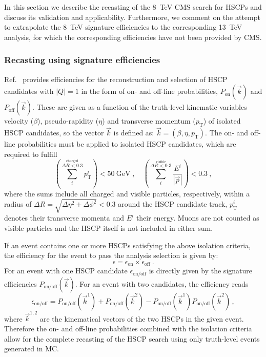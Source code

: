 In this section we describe the recasting of the 8~TeV CMS
search for HSCPs and discuss its validation and applicability.
Furthermore, we comment on the attempt to extrapolate
the 8~TeV signature efficiencies to the corresponding 13~TeV analysis, for
which the corresponding efficiencies have not been provided by CMS.

\subsubsection{Recasting using signature efficiencies}\label{sec:signatureeff}

Ref.~\cite{Khachatryan:2015lla} provides efficiencies for the reconstruction
and selection of HSCP candidates with $|Q|=1$ in the form of on- and
off-line probabilities, $P_\text{on}(\vec{k})$ and $P_\text{off}(\vec{k})$.
These are given as a function of the truth-level kinematic variables
velocity ($\beta$), pseudo-rapidity ($\eta$) and
transverse momentum ($p_\text{T}$) of isolated HSCP candidates, so
the vector $\vec{k}$ is defined as: $\vec{k}=(\beta,\eta,p_\text{T})$.
The on- and off-line probabilities must be applied to
isolated HSCP candidates, which are required to fulfill
%
\begin{equation}
\left( \sum_{i}^{\stackrel{\text{charged}}{\Delta R<0.3}} \!p_\text{T}^{i}
\right) < 50~\text{GeV}
\;,\quad
\left(
\sum_{i}^{\stackrel{\text{visible}}{\Delta R<0.3}}  \frac{E^i}{
|\vec{p}|} \right)  < 0.3~,
\label{eq:GenTkIso1}
\end{equation}
%
where the sums include all charged and visible particles, respectively,
within a radius of $\Delta R=\sqrt{\Delta\eta^2+\Delta \phi^2}<0.3$ around the
HSCP candidate track, $p_\text{T}^{i}$ denotes their transverse momenta and $E^i$
their energy. Muons are not counted as visible particles and the HSCP itself
is not included in either sum.

If an event contains one or more HSCPs satisfying the above isolation
criteria, the efficiency for the event to pass the analysis selection is
given by:
%
\begin{equation}
\label{eq:Technique}
\epsilon = \epsilon_{\text{on}} \times \epsilon_{\text{off}}
~.
\end{equation}
%
For an event with one HSCP candidate $\epsilon_{\text{on/off}}$ is
directly given by the signature efficiencies $P_{\text{on/off}}(\vec{k})$.
For an event with two candidates, the efficiency reads~\cite{Khachatryan:2015lla}
\begin{equation}
\label{eq:EventAcceptance}
\epsilon_{\text{on}/\text{off}}
= P_{\text{on}/\text{off}}(\vec{k}^1)  + P_{\text{on}/\text{off}}(\vec{k}^2)
- P_{\text{on}/\text{off}}(\vec{k}^1)  P_{\text{on}/\text{off}}(\vec{k}^2)  \,,
\end{equation}
where $\vec{k}^{1,2}$ are the kinematical vectors of the two HSCPs in the given
event. Therefore the on- and off-line probabilities combined with the isolation
criteria allow for the complete recasting of the HSCP search using only truth-level events generated
in MC.


